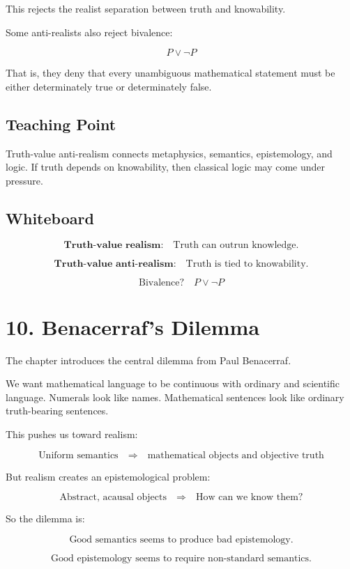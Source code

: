\documentclass[11pt]{article}
\begin{document}
This rejects the realist separation between truth and knowability.

Some anti-realists also reject bivalence:

\[
P \lor \neg P
\]

That is, they deny that every unambiguous mathematical statement must be either
determinately true or determinately false.

\subsection*{Teaching Point}

Truth-value anti-realism connects metaphysics, semantics, epistemology, and logic. If
truth depends on knowability, then classical logic may come under pressure.

\subsection*{Whiteboard}

\[
\textbf{Truth-value realism:}
\quad
\text{Truth can outrun knowledge.}
\]

\[
\textbf{Truth-value anti-realism:}
\quad
\text{Truth is tied to knowability.}
\]

\[
\text{Bivalence?}
\quad
P \lor \neg P
\]

\section*{10. Benacerraf's Dilemma}

The chapter introduces the central dilemma from Paul Benacerraf.

We want mathematical language to be continuous with ordinary and scientific language.
Numerals look like names. Mathematical sentences look like ordinary truth-bearing
sentences.

This pushes us toward realism:

\[
\text{Uniform semantics}
\quad \Rightarrow \quad
\text{mathematical objects and objective truth}
\]

But realism creates an epistemological problem:

\[
\text{Abstract, acausal objects}
\quad \Rightarrow \quad
\text{How can we know them?}
\]

So the dilemma is:

\[
\boxed{
\text{Good semantics seems to produce bad epistemology.}
}
\]

\[
\boxed{
\text{Good epistemology seems to require non-standard semantics.}
}
\]
\end{document}
